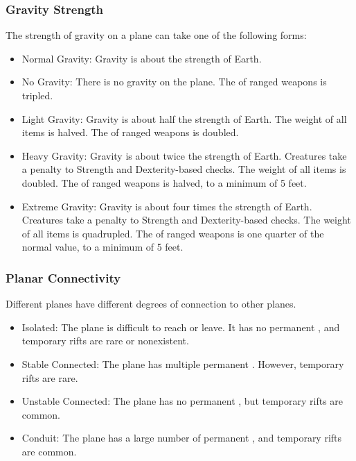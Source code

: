         \subsubsection{Gravity Strength} The strength of gravity on a plane can take one of the following forms:
            \begin{itemize}
                \item Normal Gravity: Gravity is about the strength of Earth.
                \item No Gravity: There is no gravity on the plane.
                    The  of ranged weapons is tripled.
                \item Light Gravity: Gravity is about half the strength of Earth.
                    The weight of all items is halved.
                    The  of ranged weapons is doubled.
                \item Heavy Gravity: Gravity is about twice the strength of Earth.
                    Creatures take a  penalty to Strength and Dexterity-based checks.
                    The weight of all items is doubled.
                    The  of ranged weapons is halved, to a minimum of 5 feet.
                \item Extreme Gravity: Gravity is about four times the strength of Earth.
                    Creatures take a  penalty to Strength and Dexterity-based checks.
                    The weight of all items is quadrupled.
                    The  of ranged weapons is one quarter of the normal value, to a minimum of 5 feet.
            \end{itemize}

        \subsubsection{Planar Connectivity}
            Different planes have different degrees of connection to other planes.
            \begin{itemize}
                \item Isolated: The plane is difficult to reach or leave.
                    It has no permanent , and temporary rifts are rare or nonexistent.
                \item Stable Connected: The plane has multiple permanent .
                    However, temporary rifts are rare.
                \item Unstable Connected: The plane has no permanent , but temporary rifts are common.
                \item Conduit: The plane has a large number of permanent , and temporary rifts are common.
            \end{itemize}

